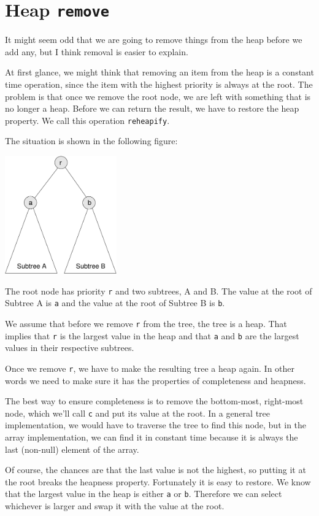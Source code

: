 \documentclass[12pt]{book}
\theoremstyle{exercise}
\begin{document}
\section{Heap {\tt remove}}

It might seem odd that we are going to remove things from the
heap before we add any, but I think removal is easier
to explain.

At first glance, we might think that removing an item from the
heap is a constant time operation, since the item with
the highest priority is always at the root.  The problem is that
once we remove the root node, we are left with something that
is no longer a heap.  Before we can return the result, we have
to restore the heap property.  We call this operation
{\tt reheapify}.

The situation is shown in the following figure:
 
\includegraphics[height=2in]{figs/tree5.pdf}
 
The root node has priority {\tt r} and two subtrees, A and B.
The value at the root of Subtree A is {\tt a} and the value at
the root of Subtree B is {\tt b}.

We assume that before we remove {\tt r} from the tree, the
tree is a heap.  That implies that {\tt r} is the largest value
in the heap and that {\tt a} and {\tt b} are the largest values
in their respective subtrees.

Once we remove {\tt r}, we have to make the resulting tree
a heap again.  In other words we need to make sure it has
the properties of completeness and heapness.

The best way to ensure completeness is to remove the bottom-most,
right-most node, which we'll call {\tt c} and put its value at the
root.  In a general tree implementation, we would have to traverse the
tree to find this node, but in the array implementation, we can find
it in constant time because it is always the last (non-null) element
of the array.

Of course, the chances are that the last value is not the highest,
so putting it at the root breaks the heapness property.  Fortunately
it is easy to restore.  We know that the largest value in the
heap is either {\tt a} or {\tt b}.  Therefore we can select whichever
is larger and swap it with the value at the root.
\end{document}
